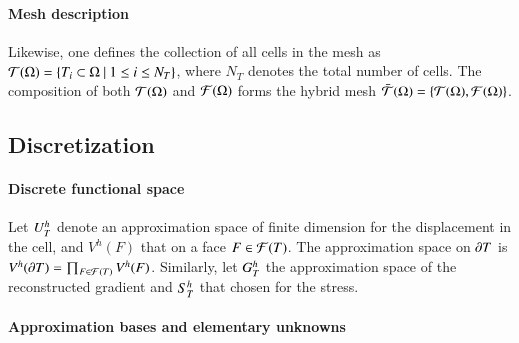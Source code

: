 \paragraph{Mesh description}

Likewise, one defines the collection of all cells in the mesh
as $\mathcal{T}(\Omega) = \{ T_i \subset \Omega \ \vert \ 1 \leq i
\leq N_{T} \}$, where $N_T$ denotes the total number of cells. The
composition of both $\mathcal{T}(\Omega)$ and
$\mathcal{F}{}(\Omega)$ forms the hybrid mesh
$\bar{\mathcal{T}}({\Omega}) = \{ \mathcal{T}(\Omega),
\mathcal{F}(\Omega) \}$.

\subsection{Discretization}

\paragraph{Discrete functional space}

Let $U^h_{T}$ denote an
approximation space of finite dimension for the displacement in the
cell, and $V^h(F)$ that on a face $F \in \mathcal{F}(T)$. The
approximation space on $\partial T$ is $V^h(\partial T) = \prod_{F \in
  \mathcal{F}(T)} V^h(F)$. Similarly, let $G^h_{T}$
the approximation space of the reconstructed gradient and
$S^h_{T}$ that chosen for the stress.

\paragraph{Approximation bases and elementary unknowns}

